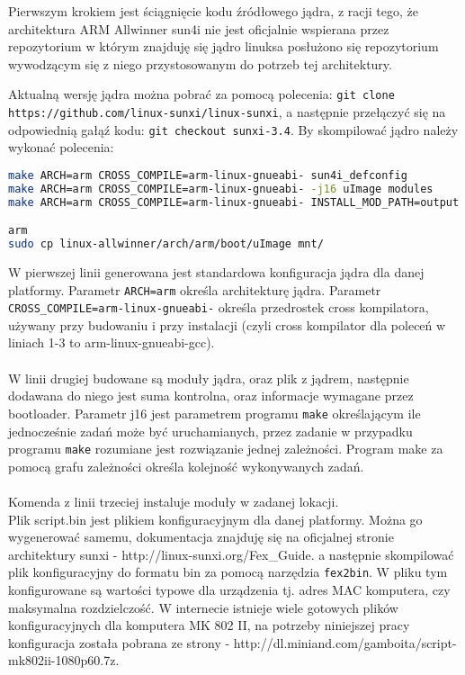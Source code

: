 Pierwszym krokiem jest ściągnięcie kodu źródłowego jądra, z racji tego, że architektura ARM Allwinner sun4i nie jest oficjalnie wspierana przez repozytorium w którym znajduję się jądro linuksa posłużono się repozytorium wywodzącym się z niego przystosowanym do potrzeb tej architektury.

Aktualną wersję jądra można pobrać za pomocą polecenia: \lstinline|git clone https://github.com/linux-sunxi/linux-sunxi|, a następnie przełączyć się na odpowiednią gałąź kodu: \lstinline|git checkout sunxi-3.4|. By skompilować jądro należy wykonać polecenia:

\begin{lstlisting}[language=bash]
make ARCH=arm CROSS_COMPILE=arm-linux-gnueabi- sun4i_defconfig
make ARCH=arm CROSS_COMPILE=arm-linux-gnueabi- -j16 uImage modules
make ARCH=arm CROSS_COMPILE=arm-linux-gnueabi- INSTALL_MOD_PATH=output modules_install

arm
sudo cp linux-allwinner/arch/arm/boot/uImage mnt/
\end{lstlisting}

W pierwszej linii generowana jest standardowa konfiguracja jądra dla danej platformy. Parametr \lstinline|ARCH=arm| określa architekturę jądra. Parametr \lstinline|CROSS_COMPILE=arm-linux-gnueabi-| określa przedrostek cross kompilatora, używany przy budowaniu i przy instalacji (czyli cross kompilator dla poleceń w liniach 1-3 to arm-linux-gnueabi-gcc).
\\
\\
W linii drugiej budowane są moduły jądra, oraz plik z jądrem, następnie dodawana do niego jest suma kontrolna, oraz informacje wymagane przez bootloader. Parametr j16 jest parametrem programu \lstinline|make| określającym ile jednocześnie zadań może być uruchamianych, przez zadanie w przypadku programu \lstinline|make| rozumiane jest rozwiązanie jednej zależności. Program make za pomocą grafu zależności określa kolejność wykonywanych zadań.
\\
\\
Komenda z linii trzeciej instaluje moduły w zadanej lokacji.
\\
Plik script.bin jest plikiem konfiguracyjnym dla danej platformy. Można go wygenerować samemu, dokumentacja znajduję się na oficjalnej stronie architektury sunxi - http://linux-sunxi.org/Fex_Guide. a następnie skompilować plik konfiguracyjny do formatu bin za pomocą narzędzia \lstinline|fex2bin|. W pliku tym konfigurowane są wartości typowe dla urządzenia tj. adres MAC komputera, czy maksymalna rozdzielczość.  W internecie istnieje wiele gotowych plików konfiguracyjnych dla komputera MK 802 II, na potrzeby niniejszej pracy konfiguracja została pobrana ze strony - http://dl.miniand.com/gamboita/script-mk802ii-1080p60.7z. 

